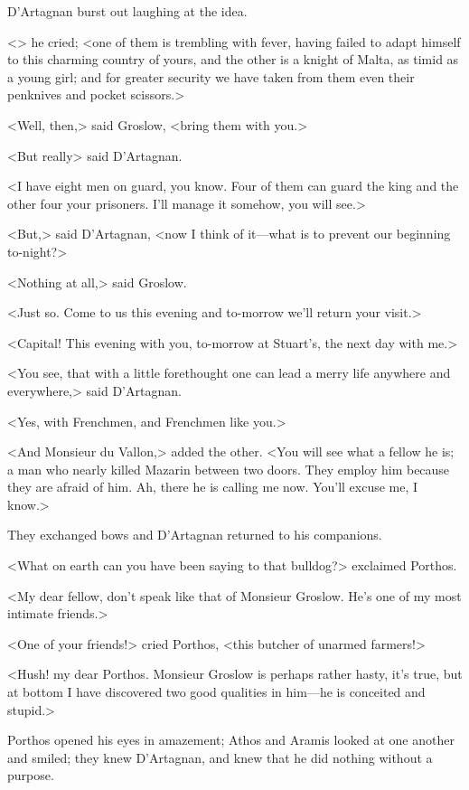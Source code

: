 D'Artagnan burst out laughing at the idea.

<> he cried; <one of them is trembling with fever, having failed to adapt himself to this charming country of yours, and the other is a knight of Malta, as timid as a young girl; and for greater security we have taken from them even their penknives and pocket scissors.>

<Well, then,> said Groslow, <bring them with you.>

<But really\longdash> said D'Artagnan.

<I have eight men on guard, you know. Four of them can guard the king and the other four your prisoners. I'll manage it somehow, you will see.>

<But,> said D'Artagnan, <now I think of it—what is to prevent our beginning to-night?>

<Nothing at all,> said Groslow.

<Just so. Come to us this evening and to-morrow we'll return your visit.>

<Capital! This evening with you, to-morrow at Stuart's, the next day with me.>

<You see, that with a little forethought one can lead a merry life anywhere and everywhere,> said D'Artagnan.

<Yes, with Frenchmen, and Frenchmen like you.>

<And Monsieur du Vallon,> added the other. <You will see what a fellow he is; a man who nearly killed Mazarin between two doors. They employ him because they are afraid of him. Ah, there he is calling me now. You'll excuse me, I know.>

They exchanged bows and D'Artagnan returned to his companions.

<What on earth can you have been saying to that bulldog?> exclaimed Porthos.

<My dear fellow, don't speak like that of Monsieur Groslow. He's one of my most intimate friends.>

<One of your friends!> cried Porthos, <this butcher of unarmed farmers!>

<Hush! my dear Porthos. Monsieur Groslow is perhaps rather hasty, it's true, but at bottom I have discovered two good qualities in him—he is conceited and stupid.>

Porthos opened his eyes in amazement; Athos and Aramis looked at one another and smiled; they knew D'Artagnan, and knew that he did nothing without a purpose.

